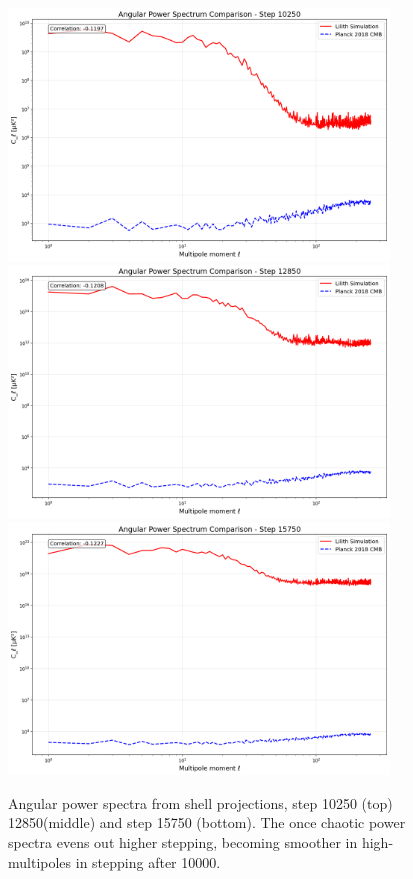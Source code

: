 \begin{figure}[ht]
  \centering
  \includegraphics[width=0.9\textwidth]{images/power_spectrum_010250.png}
  \includegraphics[width=0.9\textwidth]{images/power_spectrum_012850.png}
  \includegraphics[width=0.9\textwidth]{images/power_spectrum_015750.png}
  \caption{Angular power spectra from shell projections, step 10250 (top) 12850(middle) and step 15750 (bottom). The once chaotic power spectra evens out higher stepping, becoming smoother in high-multipoles in stepping after 10000.}
\end{figure}

